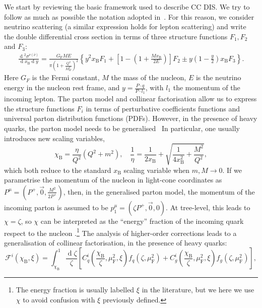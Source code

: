 \documentclass[letterpaper,11pt]{article}
\DeclareMathOperator{\De}{d}
\newcommand{\de}{\De\!}
\newcommand{\xb}{x_{\text{B}}}
\newcommand{\chib}{\chi_{\text{B}}}
\newcommand{\muf}{\mu_{\text{F}}}
\begin{document}
We start by reviewing the basic framework used to describe CC DIS. We try to follow as much as possible the notation adopted in~\cite{Corcella:2003ib}. For this reason, we consider neutrino scattering (a similar expression holds for lepton scattering) and write the double differential cross section in terms of three structure functions $F_1, F_2$ and $F_3$:
\begin{align}\label{eq:sigma DIS CC}
		\frac{\de^2\sigma^{\nu (\bar{\nu})}}{\de \xb \de y}= \frac{G_{\text{F}}M E}{\pi \left(1+\frac{Q^2}{M_W^2}\right)^2}\left\{y^2 \xb F_1+\left[1-\left(1+\frac{M \xb}{2 E}\right)\right]F_2\pm y\left(1-\frac{y}{2}\right)\xb F_3\right\}.
\end{align}
Here $G_F$ is the Fermi constant, $M$ the mass of the nucleon, $E$ is the neutrino energy in the nucleon rest frame, and $y= \frac{P\cdot q}{P\cdot l_1}$,
with $l_1$ the momentum of the incoming lepton. The parton model and collinear factorisation allow us to express the structure functions $F_i$ in terms of perturbative coefficients functions and universal parton distribution functions (PDFs). However, in the presence of heavy quarks, the parton model needs to be generalised~\cite{Aivazis:1993kh,Aivazis:1993pi,Kretzer:1998ju,Collins:1998rz}
%
In particular, one usually introduces new scaling variables,
\begin{equation}
	\chi_{\text{B}}=\frac{\eta}{Q^2}\left(Q^2+m^2\right), \quad 	\frac{1}{\eta} = \frac{1}{2\xb}+\sqrt{\frac{1}{4\xb^2}+\frac{M^2}{Q^2}},
\end{equation}
which both reduce to the standard $x_\text{B}$ scaling variable when $m, M \to 0$.
%
If we parametrise the momentum of the nucleon in light-cone coordinates as $P^\mu=(P^+,\vec{0},\frac{M^2}{2 P^+})$, then, in the generalised parton model, the momentum of the incoming parton is assumed to be $p_1^\mu=(\zeta P^+,\vec{0},0)$. 
%
At tree-level, this leads to $\chi=\zeta$, so $\chi$ can be interpreted as the ``energy'' fraction of the incoming quark respect to the nucleon \cite{Aivazis:1993kh}.\footnote{The energy fraction is usually labelled $\xi$ in the literature, but we here we use $\chi$ to avoid confusion with $\xi$ previously defined.}
%
The analysis of higher-order corrections leads to a generalisation of collinear factorisation, in the presence of heavy quarks:
\begin{equation} \label{eq:coll-fact-HQ}
	\mathcal{F}^i(\chib,\xi)=\int^1_{\chib} \frac{\de \zeta}{\zeta} \left[C^i_q\left(\frac{\chib}{\zeta},\muf^2,\xi\right) f_q(\zeta,\muf^2)+C^i_g\left(\frac{\chib}{\zeta},\muf^2,\xi\right) f_g(\zeta,\muf^2)\right],
\end{equation}
\end{document}
